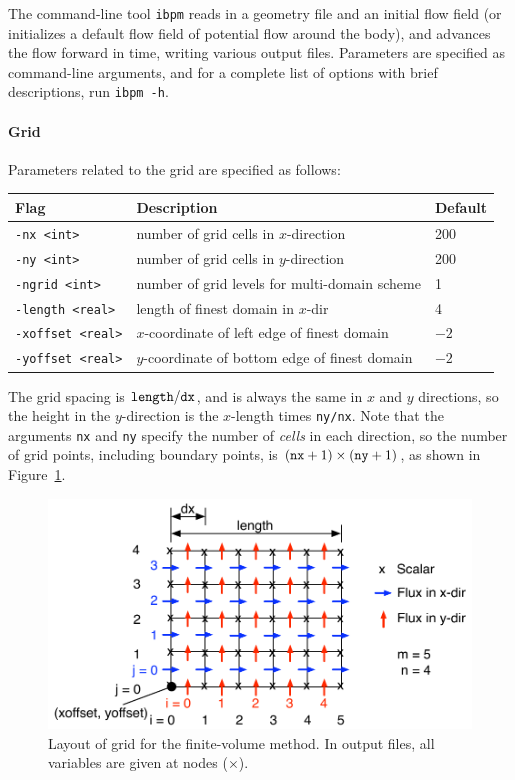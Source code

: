 \documentclass[11pt]{article}
\begin{document}
The command-line tool {\tt ibpm} reads in a geometry file and an initial flow field (or initializes a default flow field of potential flow around the body), and advances the flow forward in time, writing various output files.  Parameters are specified as command-line arguments, and for a complete list of options with brief descriptions, run {\tt ibpm -h}.  

\paragraph{Grid}
Parameters related to the grid are specified as follows:

\begin{center}
\begin{tabular}{lll}
Flag & Description & Default\\
\hline
\verb|-nx <int>|         & number of grid cells in $x$-direction & 200\\
\verb|-ny <int>|         & number of grid cells in $y$-direction & 200\\
\verb|-ngrid <int>|      & number of grid levels for multi-domain scheme & 1\\
\verb|-length <real>|    & length of finest domain in $x$-dir & 4\\
\verb|-xoffset <real>|   & $x$-coordinate of left edge of finest domain & $-2$ \\
\verb|-yoffset <real>|   & $y$-coordinate of bottom edge of finest domain & $-2$\\
\end{tabular}
\end{center}

The grid spacing is ${\tt length}/{\tt dx}$, and is always the same in $x$ and $y$ directions, so the height in the $y$-direction is the $x$-length times {\tt ny/nx}.  Note that the arguments {\tt nx} and {\tt ny} specify the number of {\em cells\/} in each direction, so the number of grid points, including boundary points, is $({\tt nx}+1) \times ({\tt ny}+1)$, as shown in Figure~\ref{fig:grid}.
\begin{figure}
\begin{center}
\includegraphics[width=\linewidth]{grid}
\caption{Layout of grid for the finite-volume method.  In output files, all variables are given at nodes ($\times$).}
\label{fig:grid}
\end{center}
\end{figure}
\end{document}
